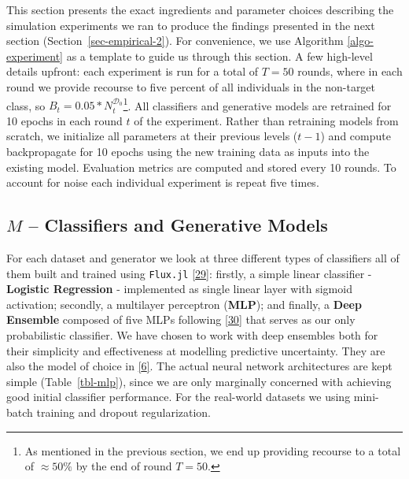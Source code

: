 \documentclass[
  conference]{IEEEtran}
\begin{document}
This section presents the exact ingredients and parameter choices
describing the simulation experiments we ran to produce the findings
presented in the next section (Section~\ref{sec-empirical-2}). For
convenience, we use Algorithm \ref{algo-experiment} as a template to
guide us through this section. A few high-level details upfront: each
experiment is run for a total of \(T=50\) rounds, where in each round we
provide recourse to five percent of all individuals in the non-target
class, so \(B_t=0.05 * N_t^{\mathcal{D}_0}\)\footnote{As mentioned in
  the previous section, we end up providing recourse to a total of
  \(\approx50\%\) by the end of round \(T=50\).}. All classifiers and
generative models are retrained for 10 epochs in each round \(t\) of the
experiment. Rather than retraining models from scratch, we initialize
all parameters at their previous levels (\(t-1\)) and compute
backpropagate for 10 epochs using the new training data as inputs into
the existing model. Evaluation metrics are computed and stored every 10
rounds. To account for noise each individual experiment is repeat five
times.

\hypertarget{sec-empirical-classifiers}{%
\subsection{\texorpdfstring{\(M\) -- Classifiers and Generative
Models}{M -- Classifiers and Generative Models}}\label{sec-empirical-classifiers}}

For each dataset and generator we look at three different types of
classifiers all of them built and trained using \texttt{Flux.jl}
\protect\hyperlink{ref-innes2018fashionable}{{[}29{]}}: firstly, a
simple linear classifier - \textbf{Logistic Regression} - implemented as
single linear layer with sigmoid activation; secondly, a multilayer
perceptron (\textbf{MLP}); and finally, a \textbf{Deep Ensemble}
composed of five MLPs following
\protect\hyperlink{ref-lakshminarayanan2016simple}{{[}30{]}} that serves
as our only probabilistic classifier. We have chosen to work with deep
ensembles both for their simplicity and effectiveness at modelling
predictive uncertainty. They are also the model of choice in
\protect\hyperlink{ref-schut2021generating}{{[}6{]}}. The actual neural
network architectures are kept simple (Table~\ref{tbl-mlp}), since we
are only marginally concerned with achieving good initial classifier
performance. For the real-world datasets we using mini-batch training
and dropout regularization.
\end{document}
